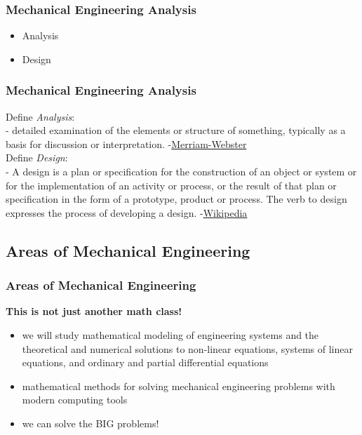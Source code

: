 \documentclass[fleqn]{beamer} %
\newcommand{\sectionIsubsectionItitle}{Mechanical Engineering Analysis}
\newcommand{\sectionIsubsectionIItitle}{Areas of Mechanical Engineering}
\begin{document}
			\begin{frame}
				\frametitle{\sectionIsubsectionItitle}
				\bigskip

			    \begin{itemize}
					\item Analysis \vspace{15mm}
					\item Design
				\end{itemize}  

				\btVFill
			\end{frame}

			\begin{frame}
				\frametitle{\sectionIsubsectionItitle}
				\bigskip

				Define {\it Analysis}: \\	
				- detailed examination of the elements or structure of something, typically as a basis for discussion or interpretation. {\tiny -\href{https://www.merriam-webster.com/dictionary/analysis}{Merriam-Webster}} \vspace{5mm} \\ 

				Define {\it Design}: \\
				- A design is a plan or specification for the construction of an object or system or for the implementation of an activity or process, or the result of that plan or specification in the form of a prototype, product or process. The verb to design expresses the process of developing a design. {\tiny -\href{https://en.wikipedia.org/wiki/Design}{Wikipedia}}\\

				\btVFill
			\end{frame}

		\subsection{\sectionIsubsectionIItitle}\label{sectionIsubsectionII}

			\begin{frame}
				\frametitle{\sectionIsubsectionIItitle}
				\bigskip

				\textbf{This is not just another math class!}\\

				\begin{itemize}
					\item we will study mathematical modeling of engineering systems and the theoretical and numerical solutions to non-linear equations, systems of linear equations, and ordinary and partial differential equations \\
					\item mathematical methods for solving mechanical engineering problems with modern computing tools\\
					\item we can solve the \large{BIG} problems!
				\end{itemize}  

				\btVFill
			\end{frame}
\end{document}
